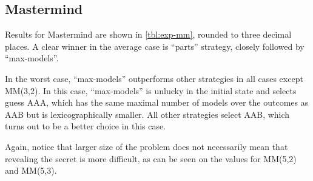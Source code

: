 \subsection{Mastermind}

Results for Mastermind are shown in \autoref{tbl:exp-mm},
  rounded to three decimal places.
A clear winner in the average case is ``parts'' strategy,
  closely followed by ``max-models''.

In the worst case, ``max-models'' outperforms other
  strategies in all cases except MM(3,2).
In this case, ``max-models'' is unlucky in the initial state
  and selects guess AAA,
  which has the same maximal number of models over the outcomes as AAB
  but is lexicographically smaller.
All other strategies select AAB,
  which turns out to be a better choice in this case.

Again, notice that larger size of the problem does not necessarily mean that
  revealing the secret is more difficult,
  as can be seen on the values for MM(5,2) and MM(5,3).

